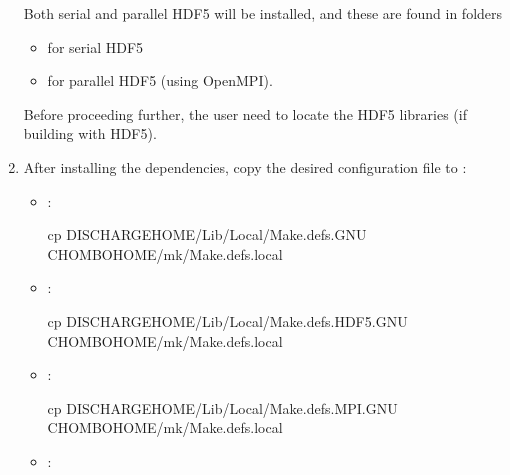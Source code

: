 \documentclass[letterpaper,10pt,english]{sphinxmanual}
\begin{document}
\begin{enumerate}
Both serial and parallel HDF5 will be installed, and these are  found in folders
\begin{itemize}
\item {} 
 for serial HDF5

\item {} 
 for parallel HDF5 (using OpenMPI).

\end{itemize}

Before proceeding further, the user need to locate the HDF5 libraries (if building with HDF5).

\item {} 
After installing the dependencies, copy the desired configuration file to :
\begin{itemize}
\item {} 
:

\begin{sphinxVerbatim}[commandchars=\\\{\},formatcom=\scriptsize]
cp \PYGZdl{}DISCHARGE\PYGZus{}HOME/Lib/Local/Make.defs.GNU \PYGZdl{}CHOMBO\PYGZus{}HOME/mk/Make.defs.local
\end{sphinxVerbatim}

\item {} 
:

\begin{sphinxVerbatim}[commandchars=\\\{\},formatcom=\scriptsize]
cp \PYGZdl{}DISCHARGE\PYGZus{}HOME/Lib/Local/Make.defs.HDF5.GNU \PYGZdl{}CHOMBO\PYGZus{}HOME/mk/Make.defs.local
\end{sphinxVerbatim}

\item {} 
:

\begin{sphinxVerbatim}[commandchars=\\\{\},formatcom=\scriptsize]
cp \PYGZdl{}DISCHARGE\PYGZus{}HOME/Lib/Local/Make.defs.MPI.GNU \PYGZdl{}CHOMBO\PYGZus{}HOME/mk/Make.defs.local
\end{sphinxVerbatim}

\item {} 
:


\end{itemize}
\end{enumerate}
\end{document}
